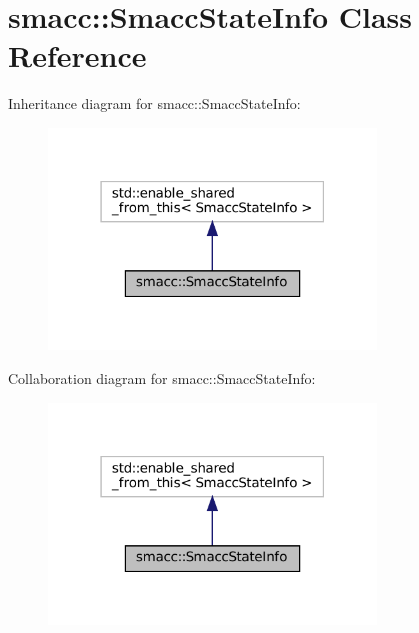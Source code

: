 \hypertarget{classsmacc_1_1SmaccStateInfo}{}\section{smacc\+:\+:Smacc\+State\+Info Class Reference}
\label{classsmacc_1_1SmaccStateInfo}


Inheritance diagram for smacc\+:\+:Smacc\+State\+Info\+:
\nopagebreak
\begin{figure}[H]
\begin{center}
\leavevmode
\includegraphics[width=247pt]{classsmacc_1_1SmaccStateInfo__inherit__graph}
\end{center}
\end{figure}


Collaboration diagram for smacc\+:\+:Smacc\+State\+Info\+:
\nopagebreak
\begin{figure}[H]
\begin{center}
\leavevmode
\includegraphics[width=247pt]{classsmacc_1_1SmaccStateInfo__coll__graph}
\end{center}
\end{figure}
